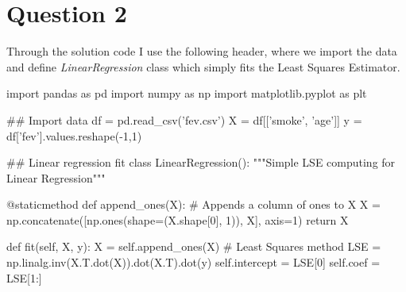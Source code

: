 \documentclass[a4paper]{article}
\begin{document}
\section{Question 2}
Through the solution code I use the following header, where we import the data and define \textit{LinearRegression} class which simply fits the Least Squares Estimator.
\begin{python}
	import pandas as pd
	import numpy as np
	import matplotlib.pyplot as plt
	
	## Import data
	df = pd.read_csv('fev.csv')
	X = df[['smoke', 'age']]
	y = df['fev'].values.reshape(-1,1)
	
	## Linear regression fit
	class LinearRegression():
	    """Simple LSE computing for Linear Regression"""
	    
	    @staticmethod
	    def append_ones(X):
	        # Appends a column of ones to X
	        X = np.concatenate([np.ones(shape=(X.shape[0], 1)), X], axis=1)
	        return X
	    
	    def fit(self, X, y):
	        X = self.append_ones(X)
	        # Least Squares method
	        LSE = np.linalg.inv(X.T.dot(X)).dot(X.T).dot(y)
	        self.intercept = LSE[0]
	        self.coef = LSE[1:]
\end{python}
\end{document}
